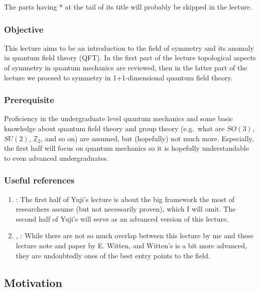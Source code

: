 \documentclass[
]{scrartcl}
\providecommand{\tightlist}{%
  \setlength{\itemsep}{0pt}\setlength{\parskip}{0pt}}
\numberwithin{equation}{section}
\theoremstyle{definition}
\theoremstyle{definition}
\theoremstyle{definition}
\theoremstyle{definition}
\theoremstyle{remark}
\begin{document}
The parts having * at the tail of its title will probably be skipped in the lecture.

\hypertarget{objective}{%
\subsubsection{Objective}\label{objective}}

This lecture aims to be an introduction to the field of symmetry and its anomaly in quantum field theory (QFT). In the first part of the lecture topological aspects of symmetry in quantum mechanics are reviewed, then in the latter part of the lecture we proceed to symmetry in 1+1-dimensional quantum field theory.

\hypertarget{prerequisite}{%
\subsubsection{Prerequisite}\label{prerequisite}}

Proficiency in the undergraduate level quantum mechanics and some basic knowledge about quantum field theory and group theory (e.g.~what are \(SO(3)\), \(SU(2)\), \(\mathbb{Z}_2\), and so on) are assumed, but (hopefully) not much more. Especially, the first half will focus on quantum mechanics so it is hopefully understandable to even advanced undergraduates.

\hypertarget{othernotes}{%
\subsubsection{Useful references}\label{othernotes}}

\begin{enumerate}
\def\labelenumi{\arabic{enumi}.}
\tightlist
\item
  \textcite{tachikawa_2019}:
  The first half of Yuji's lecture is about the big framework the most of researchers assume (but not necessarily proven), which I will omit.
  The second half of Yuji's will serve as an advanced version of this lecture.
\item
  \textcite{Witten:2015aoa}, \textcite{Witten:2015aba}:
  While there are not so much overlap between this lecture by me and these lecture note and paper by E. Witten, and Witten's is a bit more advanced, they are undoubtedly ones of the best entry points to the field.
\end{enumerate}

\hypertarget{motivation}{%
\subsection{Motivation}\label{motivation}}
\end{document}

